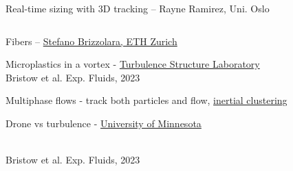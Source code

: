 \begin{frame}[label=app-27]{Real-time sizing with 3D tracking -- Rayne Ramirez, Uni. Oslo}
  \begin{columns}
 \end{columns}
\end{frame}
    
\begin{frame}[label=app-28]{Fibers -- \href{https://www.dropbox.com/s/y5gf55qqeyq5ljr/fibers.mp4?raw=1}{Stefano Brizzolara, ETH Zurich}}
\begin{center}
\end{center}    
\end{frame}

\begin{frame}[label=app-29]{Microplastics in a vortex - \href{https://www.dropbox.com/s/in5ewv968dy9j3q/microplastics.mp4?raw=1}{Turbulence Structure Laboratory}}
    \\
    Bristow et al. Exp. Fluids, 2023
\end{frame}

    
\begin{frame}[label=app-18a]{Multiphase flows - track both particles and flow, \href{}{inertial clustering}}
\begin{center}
\end{center}
\end{frame}
    
    
\begin{frame}[label=app-30]{Drone vs turbulence - \href{https://www.dropbox.com/s/3lav5rf6s8su6f5/drone.mp4?raw=1}{University of Minnesota}}
    \begin{center}
    \\
    Bristow et al. Exp. Fluids, 2023
    \end{center}
\end{frame}
    
